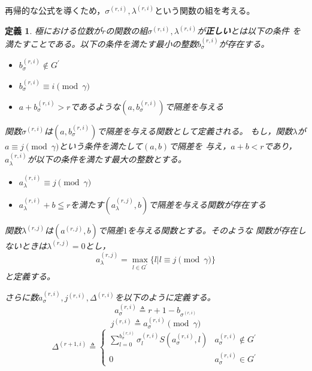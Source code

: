 \documentclass[12pt]{jarticle}
\theoremstyle{break}
\newtheorem{definition}[theorem]{定義}
\def\itDelta{\mathit{\Delta}}
\begin{document}
再帰的な公式を導くため，$\sigma^{(r,i)},\lambda^{(r,i)}$という関数の組を考える。
\begin{framed}
\begin{definition}
極における位数が$r$の関数の組$\sigma^{(r,i)},\lambda^{(r,i)}$が{\bf 正しい}とは以下の条件
を満たすことである。以下の条件を満たす最小の整数$b_{\sigma}^{(r,i)}$が存在する。
\begin{itemize}
  \item $b_{\sigma}^{(r,i)}\not\in G^{\prime}$
  \item $b_{\sigma}^{(r,i)}\equiv i\pmod{\gamma}$
  \item $a+b_{\sigma}^{(r,i)}>r$であるような$(a,b_{\sigma}^{(r,i)})$で隔差を与える
\end{itemize}
関数$\sigma^{(r,i)}$は$(a,b_{\sigma}^{(r,i)})$で隔差を与える関数として定義される。
もし，関数$\lambda$が$a\equiv j\pmod{\gamma}$という条件を満たして$(a,b)$で隔差を
与え，$a+b<r$であり，$a_{\lambda}^{(r,i)}$が以下の条件を満たす最大の整数とする。
\begin{itemize}
  \item $a_{\lambda}^{(r,i)}\equiv j\pmod{\gamma}$
  \item $a_{\lambda}^{(r,i)}+b\leqq
  r$を満たす$(a_{\lambda}^{(r,j)},b)$で隔差を与える関数が存在する
\end{itemize}
関数$\lambda^{(r,j)}$は$(a^{(r,j)},b)$で隔差$1$を与える関数とする。そのような
関数が存在しないときは$\lambda^{(r,j)}=0$とし，
\begin{equation}
a_{\lambda}^{(r,j)}=\max_{l\in G^{\prime}}\{l|l\equiv j\pmod{\gamma}\}\nonumber
\end{equation}
と定義する。

さらに数$a_{\sigma}^{(r,i)},j^{(r,i)},\itDelta^{(r,i)}$を以下のように定義する。
\begin{equation}
a_{\sigma}^{(r,i)}\triangleq r+1-b_{\sigma^{(r,i)}}\nonumber
\end{equation}
\begin{equation}
j^{(r,i)}\triangleq a_{\sigma}^{(r,i)}\pmod{\gamma}\nonumber
\end{equation}
\begin{equation}
\itDelta^{(r+1,i)}\triangleq
\begin{cases}
{\displaystyle\sum_{l=0}^{b_{\sigma}^{(r,i)}}\sigma_{l}^{(r,i)}S(a_{\sigma}^{(r,i)},l)}&a_{\sigma}^{(r,i)}\not\in
G^{\prime}\\
0&a_{\sigma}^{(r,i)}\in G^{\prime}
\end{cases}
\nonumber
\end{equation}
\end{definition}
\end{framed}
\end{document}
